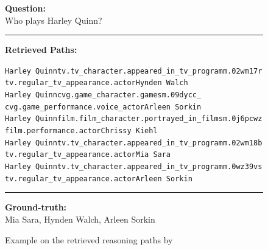 \begin{figure}[t]
\begin{tcolorbox}[colback=gray!5!white,
                  colframe=gray!75!black,
                  title=WEBQSP-WebQTest-1205]
\scriptsize

\textbf{Question:}\\
Who plays Harley Quinn?

\rule{\linewidth}{0.4pt}

\textbf{Retrieved Paths:}\\[2pt]
{\raggedright
\texttt{Harley Quinn\patharrow tv.tv\_character.appeared\_in\_tv\_program\patharrow m.02wm17r\patharrow \\ tv.regular\_tv\_appearance.actor\patharrow Hynden Walch}\\[6pt]

\texttt{Harley Quinn\patharrow cvg.game\_character.games\patharrow m.09dycc\_\patharrow \\ cvg.game\_performance.voice\_actor\patharrow Arleen Sorkin}\\[6pt]

\texttt{Harley Quinn\patharrow film.film\_character.portrayed\_in\_films\patharrow m.0j6pcwz\patharrow \\ film.performance.actor\patharrow Chrissy Kiehl}\\[6pt]

\texttt{Harley Quinn\patharrow tv.tv\_character.appeared\_in\_tv\_program\patharrow m.02wm18b\patharrow \\ tv.regular\_tv\_appearance.actor\patharrow Mia Sara}\\[6pt]

\texttt{Harley Quinn\patharrow tv.tv\_character.appeared\_in\_tv\_program\patharrow m.0wz39vs\patharrow \\ tv.regular\_tv\_appearance.actor\patharrow Arleen Sorkin}\\[6pt]

\par}

\rule{\linewidth}{0.4pt}

\textbf{Ground-truth:}\\
Mia Sara, Hynden Walch, Arleen Sorkin

\end{tcolorbox}
\caption{Example on the retrieved reasoning paths by \proj}
\label{fig:example3}
\end{figure}



